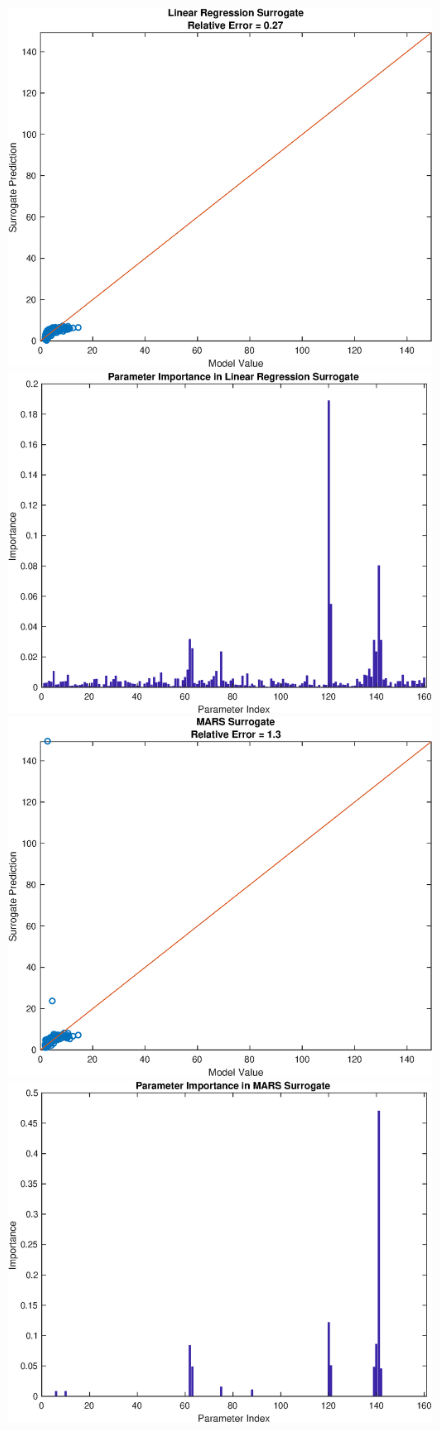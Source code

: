 \documentclass[12pt]{article}
\numberwithin{equation}{section}
\begin{document}
\begin{figure}[h]
\centering
\includegraphics[width=.49 \textwidth]{Figures/AMp_Time_to_Min_QoI_LR_Prediction_Rectangular.eps}
\includegraphics[width=.49 \textwidth]{Figures/AMp_Time_to_Min_QoI_LR_VI_Rectangular.eps}\\
\includegraphics[width=.49 \textwidth]{Figures/AMp_Time_to_Min_QoI_MARS_Prediction_Rectangular.eps}
\includegraphics[width=.49 \textwidth]{Figures/AMp_Time_to_Min_QoI_MARS_VI_Rectangular.eps}
\end{figure}
\end{document}
